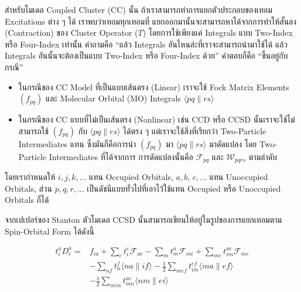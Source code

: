 สำหรับโมเดล Coupled Cluster (CC) นั้น ถ้าเราสามารถทำการแยกตัวประกอบของเทอม Excitations ต่าง ๆ ได้ เราพบว่าเทอมทุกเทอมที่%
แยกออกมานั้นจะสามารถหาได้จากการทำให้สั้นลง (Contraction) ของ Cluster Operator ($T$) โดยการใช้เพียงแค่ Integrals แบบ
Two-Index หรือ Four-Index เท่านั้น คำถามคือ \enquote{แล้ว Integrals อันไหนล่ะที่เราจะสามารถนำมาใช้ได้ แล้ว Integrals
  อันนั้นจะต้องเป็นแบบ Two-Index หรือ Four-Index ด้วย} คำตอบก็คือ \enquote{ขึ้นอยู่กับกรณี}

\begin{itemize}[topsep=0pt,noitemsep]
  \setlength\itemsep{1em}
  \item ในกรณีของ CC Model ที่เป็นแบบเส้นตรง (Linear) เราจะใช้ Fock Matrix Elements
        $\left(f_{p q}\right)$ และ Molecular Orbital (MO) Integrals $\langle p q \| r s\rangle$

  \item ในกรณีของ CC แบบที่ไม่เป็นเส้นตรง (Nonlinear) เช่น CCD หรือ CCSD นั้นเราจะใช้ไม่สามารถใช้ $\left(f_{p q}\right)$
        กับ $\langle p q \| r s\rangle$ ได้ตรง ๆ แต่เราจะใช้สิ่งที่เรียกว่า Two-Particle Intermediates แทน ซึ่งมันก็คือการนำ
        $\left(f_{p q}\right)$ มา $\langle p q \| r s\rangle$ มาดัดแปลง โดย Two-Particle Intermediates ที่ได้จากการ%
        การดัดแปลงนั้นคือ $\mathscr{F}_{p q}$ และ $\mathscr{W}_{p q r s}$ ตามลำดับ
\end{itemize}

\noindent โดยเรากำหนดให้ $i, j, k, \ldots$ แทน Occupied Orbitals, $a, b$, $c, \ldots$ แทน Unoccupied Orbitals,
ส่วน $p, q, r, \ldots$ เป็นดัชนีแบบทั่วไปที่เอาไว้ใช้แทน Occupied หรือ Unoccupied Orbitals ก็ได้

จากเปเปอร์ของ Stanton ตัวโมเดล CCSD นั้นสามารถเขียนให้อยู่ในรูปของการแยกเทอมตาม Spin-Orbital Form ได้ดังนี้

\noindent {}

\begin{equation}
  \label{eq:singles_cluster_operator}
  \begin{aligned}
    t_i^a D_i^a
    =
     & f_{i a} + \sum_e t_i^e \mathscr{F}_{a e} - \sum_m t_m^a \mathscr{F}_{m i}
    + \sum_{m e} t_{i m}^{a e} \mathscr{F}_{m e}                                                                     \\
     & - \sum_{n f} t_n^f\langle n a \| i f\rangle - \frac{1}{2} \sum_{m e f} t_{i m}^{e f}\langle m a \| e f\rangle \\
     & - \frac{1}{2} \sum_{m c n} t_{m n}^{a e}\langle n m \| e i\rangle
  \end{aligned}
\end{equation}

